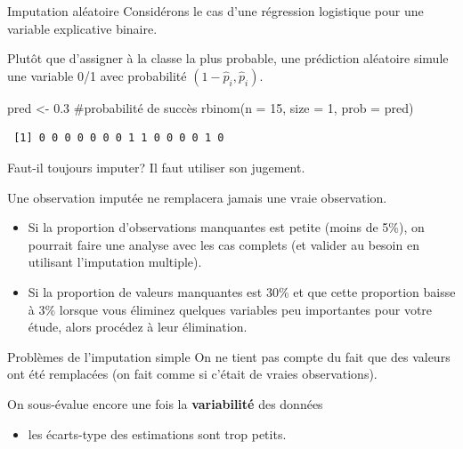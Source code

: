 \documentclass[
  ignorenonframetext,
]{beamer}
\newenvironment{Shaded}{\begin{snugshade}}{\end{snugshade}}
\newcommand{\AttributeTok}[1]{\textcolor[rgb]{0.40,0.45,0.13}{#1}}
\newcommand{\CommentTok}[1]{\textcolor[rgb]{0.37,0.37,0.37}{#1}}
\newcommand{\DecValTok}[1]{\textcolor[rgb]{0.68,0.00,0.00}{#1}}
\newcommand{\FloatTok}[1]{\textcolor[rgb]{0.68,0.00,0.00}{#1}}
\newcommand{\FunctionTok}[1]{\textcolor[rgb]{0.28,0.35,0.67}{#1}}
\newcommand{\NormalTok}[1]{\textcolor[rgb]{0.00,0.23,0.31}{#1}}
\newcommand{\OtherTok}[1]{\textcolor[rgb]{0.00,0.23,0.31}{#1}}
\providecommand{\tightlist}{%
  \setlength{\itemsep}{0pt}\setlength{\parskip}{0pt}}\usepackage{longtable,booktabs,array}
\begin{document}
\begin{frame}[fragile]{Imputation aléatoire}
\label{imputation-aluxe9atoire}
Considérons le cas d'une régression logistique pour une variable
explicative binaire.

Plutôt que d'assigner à la classe la plus probable, une prédiction
aléatoire simule une variable 0/1 avec probabilité
\((1-\widehat{p}_i, \widehat{p}_i)\).

\begin{Shaded}
\begin{Highlighting}[numbers=left,,]
\NormalTok{pred }\OtherTok{\textless{}{-}} \FloatTok{0.3} \CommentTok{\#probabilité de succès}
\FunctionTok{rbinom}\NormalTok{(}\AttributeTok{n =} \DecValTok{15}\NormalTok{, }\AttributeTok{size =} \DecValTok{1}\NormalTok{, }\AttributeTok{prob =}\NormalTok{ pred)}
\end{Highlighting}
\end{Shaded}

\begin{verbatim}
 [1] 0 0 0 0 0 0 0 1 1 0 0 0 0 1 0
\end{verbatim}
\end{frame}

\begin{frame}{Faut-il toujours imputer?}
\label{faut-il-toujours-imputer}
Il faut utiliser son jugement.

Une observation imputée ne remplacera jamais une vraie observation.

\begin{itemize}
\tightlist
\item
  Si la proportion d'observations manquantes est petite (moins de 5\%),
  on pourrait faire une analyse avec les cas complets (et valider au
  besoin en utilisant l'imputation multiple).
\item
  Si la proportion de valeurs manquantes est 30\% et que cette
  proportion baisse à 3\% lorsque vous éliminez quelques variables peu
  importantes pour votre étude, alors procédez à leur élimination.
\end{itemize}
\end{frame}

\begin{frame}{Problèmes de l'imputation simple}
\label{probluxe8mes-de-limputation-simple}
On ne tient pas compte du fait que des valeurs ont été remplacées (on
fait comme si c'était de vraies observations).

On sous-évalue encore une fois la \textbf{variabilité} des données

\begin{itemize}
\tightlist
\item
  les écarts-type des estimations sont trop petits.
\end{itemize}
\end{frame}
\end{document}
